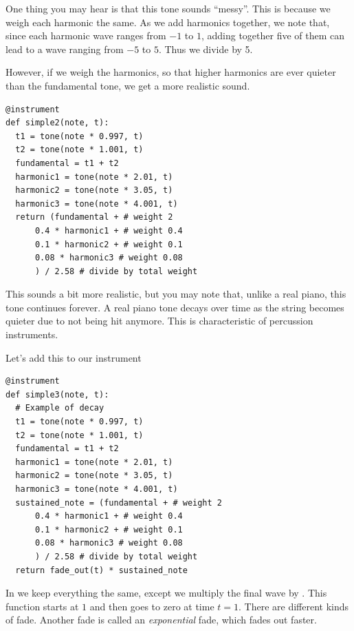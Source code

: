 One thing you may hear is that this tone sounds ``messy''. This is because we weigh each harmonic
the same. As we add harmonics together, we note that, since each harmonic wave ranges from $-1$ to
$1$, adding together five of them can lead to a wave ranging from $-5$ to $5$. Thus we divide by 5.

However, if we weigh the harmonics, so that higher harmonics are ever quieter than the fundamental
tone, we get a more realistic sound.

\begin{TryThisBox}
\begin{lstlisting}
@instrument
def simple2(note, t):
  t1 = tone(note * 0.997, t)
  t2 = tone(note * 1.001, t)
  fundamental = t1 + t2
  harmonic1 = tone(note * 2.01, t)
  harmonic2 = tone(note * 3.05, t)
  harmonic3 = tone(note * 4.001, t)
  return (fundamental + # weight 2
      0.4 * harmonic1 + # weight 0.4
      0.1 * harmonic2 + # weight 0.1
      0.08 * harmonic3 # weight 0.08
      ) / 2.58 # divide by total weight
\end{lstlisting}
\end{TryThisBox}

This sounds a bit more realistic, but you may note that, unlike a real piano, this tone continues
forever. A real piano tone decays over time as the string becomes quieter due to not being hit
anymore. This is characteristic of percussion instruments.

Let's add this to our instrument

\begin{TryThisBox}
\begin{lstlisting}
@instrument
def simple3(note, t):
  # Example of decay
  t1 = tone(note * 0.997, t)
  t2 = tone(note * 1.001, t)
  fundamental = t1 + t2
  harmonic1 = tone(note * 2.01, t)
  harmonic2 = tone(note * 3.05, t)
  harmonic3 = tone(note * 4.001, t)
  sustained_note = (fundamental + # weight 2
      0.4 * harmonic1 + # weight 0.4
      0.1 * harmonic2 + # weight 0.1
      0.08 * harmonic3 # weight 0.08
      ) / 2.58 # divide by total weight
  return fade_out(t) * sustained_note
\end{lstlisting}
\end{TryThisBox}

  In  we keep everything the
same, except we multiply the final wave by . This function starts at $1$ and then
goes to zero at time $t = 1$. There are different kinds of fade. Another fade is called an
\emph{exponential} fade, which fades out faster.

